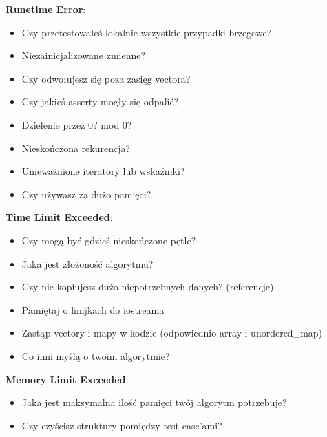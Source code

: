 {\textbf{Runetime Error}:
\begin{itemize}
	\item Czy przetestowałeś lokalnie wszystkie przypadki brzegowe?
	\item Niezainicjalizowane zmienne?
	\item Czy odwołujesz się poza zasięg vectora?
	\item Czy jakieś asserty mogły się odpalić?
	\item Dzielenie przez 0? mod 0?
	\item Nieskończona rekurencja?
	\item Unieważnione iteratory lub wskaźniki?
	\item Czy używasz za dużo pamięci?
\end{itemize}

\textbf{Time Limit Exceeded}:
\begin{itemize}
	\item Czy mogą być gdzieś nieskończone pętle?
	\item Jaka jest złożoność algorytmu?
	\item Czy nie kopiujesz dużo niepotrzebnych danych? (referencje)
	\item Pamiętaj o linijkach do iostreama
	\item Zastąp vectory i mapy w kodzie (odpowiednio array i unordered\_map)
	\item Co inni myślą o twoim algorytmie?
\end{itemize}

\textbf{Memory Limit Exceeded}:
\begin{itemize}
	\item Jaka jest maksymalna ilość pamięci twój algorytm potrzebuje?
	\item Czy czyścisz struktury pomiędzy test case'ami?
\end{itemize}
}
